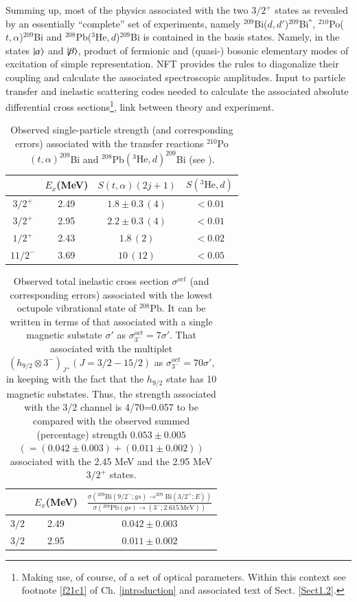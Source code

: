 Summing up, most of the physics associated with the two $3/2^+$ states as revealed by an essentially ``complete'' set of experiments, namely $^{209}$Bi($d,d'$)$^{209}$Bi$^*$, $^{210}$Po($t,\alpha$)$^{209}$Bi and $^{208}$Pb($^3\text{He},d$)$^{209}$Bi is contained in the basis states. Namely, in the states $|{\alpha} \rangle$ and $|{\beta} \rangle$, product of fermionic and (quasi-) bosonic
 elementary modes of excitation of simple representation. NFT provides the rules to diagonalize their coupling and calculate the associated spectroscopic amplitudes. Input to particle transfer and inelastic scattering codes needed to calculate the associated absolute differential cross sections\footnote{Making use, of course, of a set of optical parameters. Within this context see footnote \ref{f21c1} of Ch. \ref{introduction} and associated text of Sect. \ref{Sect1.2}.}, link between theory and experiment.  
\begin{table}
	\begin{tabular}{|c|c|c|c|}
		\hline 
		& $E_x$(MeV) & $S(t,\alpha)(2j+1)$ & $S(^3\text{He},d)$ \\
		\hline 
		$3/2^+$ & 2.49 & $1.8\pm0.3\,(4)$  & $<0.01$  \\ 
		$3/2^+$ & 2.95 & $2.2\pm0.3\,(4)$  & $<0.01$ \\ 
		$1/2^+$& 2.43 &  $1.8\,(2)$& $<0.02$ \\ 
		$11/2^-$& 3.69 & $10\,(12)$ &  $<0.05$\\ 
		\hline
	\end{tabular}\caption{Observed single-particle strength (and corresponding errors) associated with the  transfer reactions  $^{210}$Po$(t,\alpha)^{209}$Bi and $^{208}$Pb$(^3\text{He},d)^{209}$Bi (see \cite{Bortignon:77}).}\label{tabintroC1}
\end{table}
\begin{table}
	\begin{tabular}{|c|c|c|}
		\hline 
		& $E_x$(MeV) & $\frac{\sigma\left(^{209}\text{Bi}(9/2^-;gs)\rightarrow^{209}\text{Bi}(3/2^+;E)\right)}{\sigma\left(^{208}\text{Pb}(gs)\rightarrow (3^-;2.615\, \text{MeV})\right)}$  \\
		\hline 
		$3/2$ & 2.49 & $0.042\pm0.003$   \\ 
		$3/2$ & 2.95 & $0.011\pm0.002$  \\ 
		\hline
	\end{tabular}\caption{Observed total inelastic cross section $\sigma^{oct}$ (and corresponding errors) associated with the lowest octupole vibrational state of $^{208}$Pb. It can be written in terms of that associated with a single magnetic substate $\sigma'$ as $\sigma_{3^-}^{oct}=7\sigma'$. That associated with the multiplet $(h_{9/2}\otimes 3^-)_{J^+} (J=3/2-15/2)$ as $\sigma_{3^-}^{oct}=70\sigma'$, in keeping with the fact that the $h_{9/2}$ state has 10 magnetic substates. Thus, the strength associated with the 3/2 channel is 4/70=0.057 to be compared with the observed summed (percentage) strength $0.053\pm0.005 $ $(=(0.042\pm0.003)+(0.011\pm0.002))$ associated with the 2.45 MeV and the 2.95 MeV $3/2^+$ states.}\label{tabintroC2}
\end{table}
